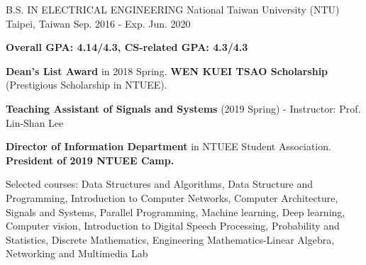 

\begin{cventries}

  \cventry
    {B.S. IN ELECTRICAL ENGINEERING } %
    {National Taiwan University (NTU) } %
    {Taipei, Taiwan} %
    {Sep. 2016 - Exp. Jun. 2020} %
    {
      \begin{cvitems} %
        \item {\textbf{Overall GPA: 4.14/4.3, CS-related GPA: 4.3/4.3} }
        \item {\textbf{Dean’s List Award} in 2018 Spring. \textbf{WEN KUEI TSAO Scholarship} (Prestigious Scholarship in NTUEE).}
        \item {\textbf{Teaching Assistant of Signals and Systems} (2019 Spring) - Instructor: Prof. Lin-Shan Lee}
        \item {\textbf{Director of Information Department} in NTUEE Student Association. \textbf{President of 2019 NTUEE Camp.}}
        \item {Selected courses: Data Structures and Algorithms, Data Structure and Programming, Introduction to Computer Networks, Computer Architecture, Signals and Systems, Parallel Programming, Machine learning, Deep learning, Computer vision, Introduction to Digital Speech Processing, Probability and Statistics, Discrete Mathematics, Engineering Mathematics-Linear Algebra, Networking and Multimedia Lab}
      \end{cvitems}
    }

\end{cventries}
